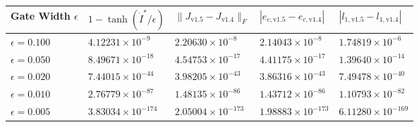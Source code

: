 \documentclass[11pt,a4paper]{article}
\theoremstyle{remark}
\begin{document}
\vspace{1.5pt}\noindent\begin{minipage}{\textwidth}\centering
{}
\vspace{1pt}
\small
\setlength{\tabcolsep}{7pt}
\begin{tabularx}{\textwidth}{lXXXX}
\toprule
\textbf{Gate Width $\epsilon$} & \textbf{$1 - \tanh(\dot{I}^*/\epsilon)$} & \textbf{$\|J_{\text{v1.5}} - J_{\text{v1.4}}\|_F$} & \textbf{$|e_{c,\text{v1.5}} - e_{c,\text{v1.4}}|$} & \textbf{$|l_{1,\text{v1.5}} - l_{1,\text{v1.4}}|$} \\
\midrule
$\epsilon = 0.100$ & $4.12231 \times 10^{-9}$ & $2.20630 \times 10^{-8}$ & $2.14043 \times 10^{-8}$ & $1.74819 \times 10^{-6}$ \\
$\epsilon = 0.050$ & $8.49671 \times 10^{-18}$ & $4.54753 \times 10^{-17}$ & $4.41175 \times 10^{-17}$ & $1.39640 \times 10^{-14}$ \\
$\epsilon = 0.020$ & $7.44015 \times 10^{-44}$ & $3.98205 \times 10^{-43}$ & $3.86316 \times 10^{-43}$ & $7.49478 \times 10^{-40}$ \\
$\epsilon = 0.010$ & $2.76779 \times 10^{-87}$ & $1.48135 \times 10^{-86}$ & $1.43712 \times 10^{-86}$ & $1.10793 \times 10^{-82}$ \\
$\epsilon = 0.005$ & $3.83034 \times 10^{-174}$ & $2.05004 \times 10^{-173}$ & $1.98883 \times 10^{-173}$ & $6.11280 \times 10^{-169}$ \\
\bottomrule
\end{tabularx}
\label{tab:eps_sweep}
\end{minipage}\vspace{1.5pt}
\end{document}

